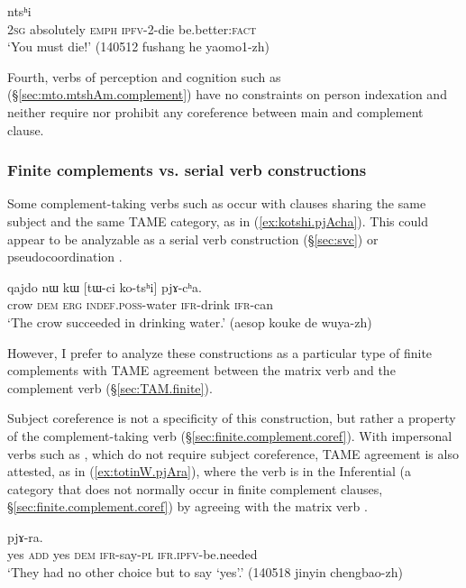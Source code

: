  \begin{exe}
\ex \label{ex:pjWtWsi.ntshi}
  ntsʰi\\
 \textsc{2sg} absolutely \textsc{emph} \textsc{ipfv}-2-die be.better:\textsc{fact} \\
 \glt `You must die!' (140512 fushang he yaomo1-zh)
 \end{exe} 
 
 Fourth, verbs of perception and cognition such as  (§\ref{sec:mto.mtshAm.complement}) have no constraints on person indexation and neither require nor prohibit any coreference between main and complement clause.

\subsubsection{Finite complements vs. serial verb constructions} \label{sec:svc.finite.agreement}
Some com\-ple\-ment-taking verbs such as  occur with clauses sharing the same subject and the same TAME category, as in (\ref{ex:kotshi.pjAcha}). This could appear to be analyzable as a serial verb construction (§\ref{sec:svc}) or pseudocoordination \citep{loedrup14agree}.

\begin{exe}
\ex   \label{ex:kotshi.pjAcha}
\gll qajdo nɯ kɯ [tɯ-ci ko-tsʰi] pjɤ-cʰa. \\
crow \textsc{dem} \textsc{erg} \textsc{indef}.\textsc{poss}-water \textsc{ifr}-drink \textsc{ifr}-can \\
\glt `The crow succeeded in drinking water.' (aesop kouke de wuya-zh)
\end{exe}

However, I prefer to analyze these constructions as a particular type of finite complements with TAME agreement between the matrix verb and the complement verb (§\ref{sec:TAM.finite}). 

Subject coreference is not a specificity of this construction, but rather a property of the com\-ple\-ment-taking verb (§\ref{sec:finite.complement.coref}). With impersonal verbs such as , which do not require subject coreference, TAME agreement is also attested, as in (\ref{ex:totinW.pjAra}), where the verb  is in the Inferential (a category that does not normally occur in finite complement clauses, §\ref{sec:finite.complement.coref}) by agreeing with the matrix verb . 

\begin{exe}
\ex   \label{ex:totinW.pjAra}
\gll [``ɣa" nɤ ``ɣa" nɯ to-ti-nɯ] pjɤ-ra. \\
yes \textsc{add} yes \textsc{dem} \textsc{ifr}-say-\textsc{pl} \textsc{ifr}.\textsc{ipfv}-be.needed \\
\glt `They had no other choice but to say `yes'.' (140518 jinyin chengbao-zh)
\end{exe}

